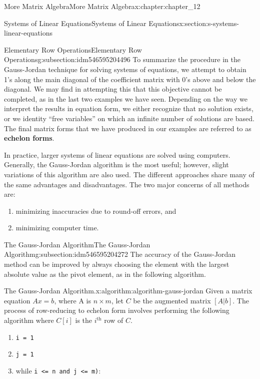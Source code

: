 \documentclass[oneside,10pt,]{book}
\newcommand{\mono}[1]{\texttt{#1}}
\newcommand{\terminology}[1]{\textbf{#1}}
\numberwithin{equation}{section}
\begin{document}
\begin{chapterptx}{More Matrix Algebra}{}{More Matrix Algebra}{}{}{x:chapter:chapter_12}
\begin{sectionptx}{Systems of Linear Equations}{}{Systems of Linear Equations}{}{}{x:section:s-systems-linear-equations}
\begin{subsectionptx}{Elementary Row Operations}{}{Elementary Row Operations}{}{}{g:subsection:idm546595204496}
To summarize the procedure in the Gauss-Jordan technique for solving systems of equations, we attempt to obtain 1's along the main diagonal of the coefficient matrix with 0's above and below the diagonal. We may find in attempting this that this objective cannot be completed, as in the last two examples we have seen.  Depending on the way we interpret the results in equation form, we either recognize that no solution exists, or we identity ``free variables'' on which an infinite number of solutions are based.  The final matrix forms that we have produced in our examples are referred to as  \terminology{echelon forms}.%
\par
In practice, larger systems of linear equations are solved using computers. Generally, the Gauss-Jordan algorithm is the most useful; however, slight variations of this algorithm are also used. The different approaches share many of the same advantages and disadvantages. The two major concerns of all methods are:%
\begin{enumerate}[label=(\arabic*)]
\item{}minimizing inaccuracies due to round-off errors, and%
\item{}minimizing computer time.%
\end{enumerate}
%
\end{subsectionptx}
%
%
\typeout{************************************************}
\typeout{************************************************}
%
\begin{subsectionptx}{The Gauss-Jordan Algorithm}{}{The Gauss-Jordan Algorithm}{}{}{g:subsection:idm546595204272}
The accuracy of the Gauss-Jordan method can be improved by always choosing the element with the largest absolute value as the pivot element, as in the following algorithm.%
\begin{algorithm}{The Gauss-Jordan Algorithm.}{}{x:algorithm:algorithm-gauss-jordan}%
%
Given a matrix equation \(A x = b\), where A is \(n \times m\), let \(C\) be the augmented matrix \([A | b]\). The process of row-reducing to echelon form involves performing the following algorithm where \(C[i]\)  is the \(i^{\textrm{th}}\)  row of \(C\).%
\begin{enumerate}[label=(\arabic*)]
\item{}\mono{i = 1}%
\item{}\mono{j = 1}%
\item{}while \mono{i <=  n  and  j <=  m)}:%
\begin{enumerate}[label=(\alph*)]

\end{enumerate}
\end{enumerate}
\end{algorithm}
\end{subsectionptx}
\end{sectionptx}
\end{chapterptx}
\end{document}
